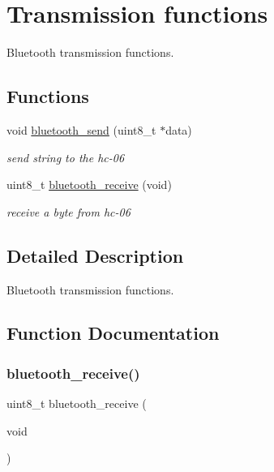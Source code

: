 \hypertarget{group___bluetooth___trans}{}\section{Transmission functions}
\label{group___bluetooth___trans}


Bluetooth transmission functions.  


\subsection*{Functions}
\begin{DoxyCompactItemize}
\item 
void \hyperlink{group___bluetooth___trans_ga31d829d5658369ee2c90b9c3cdbedfe1}{bluetooth\+\_\+send} (uint8\+\_\+t $\ast$data)
\begin{DoxyCompactList}\small\item\em send string to the hc-\/06 \end{DoxyCompactList}\item 
uint8\+\_\+t \hyperlink{group___bluetooth___trans_gab7ad1e1b94cf1cedc8a8e5151b0e25cb}{bluetooth\+\_\+receive} (void)
\begin{DoxyCompactList}\small\item\em receive a byte from hc-\/06 \end{DoxyCompactList}\end{DoxyCompactItemize}


\subsection{Detailed Description}
Bluetooth transmission functions. 



\subsection{Function Documentation}
\mbox{\label{group___bluetooth___trans_gab7ad1e1b94cf1cedc8a8e5151b0e25cb}} 
\subsubsection{\texorpdfstring{bluetooth\+\_\+receive()}{bluetooth\_receive()}}
{\footnotesize\ttfamily uint8\+\_\+t bluetooth\+\_\+receive (\begin{DoxyParamCaption}\item[{void}]{ }\end{DoxyParamCaption})}



